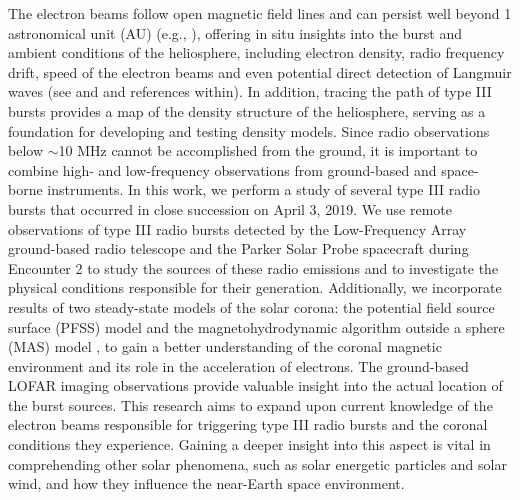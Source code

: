 The electron beams follow open magnetic field lines and can persist well beyond 1 astronomical unit (AU) (e.g., \cite{dulk_1985, boudjada_2020}), offering in situ insights into the burst and ambient conditions of the heliosphere, including electron density, radio frequency drift, speed of the electron beams and even potential direct detection of Langmuir waves (see \cite{gurnett_1976, gurnett_1977} and \cite{reid_2014} and references within). In addition, tracing the path of type III bursts provides a map of the density structure of the heliosphere, serving as a foundation for developing and testing density models.
Since radio observations below $\sim$10 MHz cannot be accomplished from the ground, it is important to combine high- and low-frequency observations from ground-based and space-borne instruments.
In this work, we perform a study of several type III radio bursts that occurred in close succession on April 3, 2019. We use remote observations of type III radio bursts detected by the Low-Frequency Array \cite[LOFAR]{lofar_2013} ground-based radio telescope and the Parker Solar Probe \cite[PSP]{fox_2016} spacecraft during Encounter 2 to study the sources of these radio emissions and to investigate the physical conditions responsible for their generation. Additionally, we incorporate results of two steady-state models of the solar corona: the potential field source surface (PFSS) model \cite{altschuler_1969, schatten_1969} and the magnetohydrodynamic algorithm outside a sphere (MAS) model \cite{mhd_1999}, to gain a better understanding of the coronal magnetic environment and its role in the acceleration of electrons. 
The ground-based LOFAR imaging observations provide valuable insight into the actual location of the burst sources. This research aims to expand upon current knowledge of the electron beams responsible for triggering type III radio bursts and the coronal conditions they experience. Gaining a deeper insight into this aspect is vital in comprehending other solar phenomena, such as solar energetic particles and solar wind, and how they influence the near-Earth space environment.

